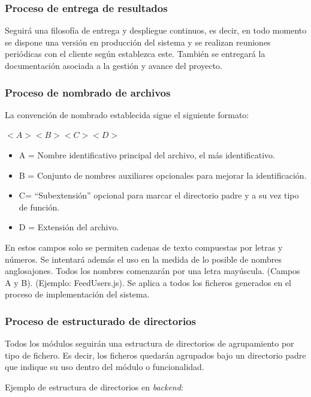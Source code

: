 \documentclass{article}
\begin{document}
\subsubsection{Proceso de entrega de resultados} \label{P.EC.7}
Seguirá una filosofía de entrega y despliegue continuos, es decir, en todo momento se dispone una versión en producción del sistema y se realizan reuniones periódicas con el cliente según establezca este. También se entregará la documentación asociada a la gestión y avance del proyecto.

\subsubsection{Proceso de nombrado de archivos} \label{P.EC.8}

La convención de nombrado establecida sigue el siguiente formato:

$<A><B><C><D>$

\begin{itemize}
   \setlength{\itemsep}{0em} %
   \item A = Nombre identificativo principal del archivo, el más identificativo.
   \item B = Conjunto de nombres auxiliares opcionales para mejorar la identificación.
   \item C= “Subextensión” opcional para marcar el directorio padre y a su vez tipo de función.
   \item D = Extensión del archivo.
\end{itemize}

En estos campos solo se permiten cadenas de texto compuestas por letras y números. Se intentará además el uso en la medida de lo posible de nombres anglosajones. Todos los nombres comenzarán por una letra mayúscula. (Campos A y B). (Ejemplo: FeedUsers.js). Se aplica a todos los ficheros generados en el proceso de implementación del sistema.

\subsubsection{Proceso de estructurado de directorios} \label{P.EC.9}

Todos los módulos seguirán una estructura de directorios de agrupamiento por tipo de fichero. Es decir, los ficheros quedarán agrupados bajo un directorio padre que indique su uso dentro del módulo o funcionalidad.

Ejemplo de estructura de directorios en \textit{backend}:
\end{document}
